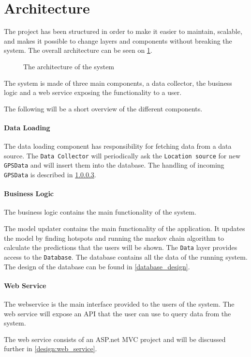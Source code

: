 \section{Architecture}

The project has been structured in order to make it easier to maintain, scalable, and makes it possible to change  layers and components without breaking the system.
The overall architecture can be seen on \cref{arch}.

\begin{figure}[h]
\center

\caption{The architecture of the system}
\label{arch}
\end{figure}

The system is made of three main components, a data collector, the business logic and a web service exposing the functionality to a user.

The following will be a short overview of the different components.

\paragraph{Data Loading}
The data loading component has responsibility for fetching data from a data source.
The \texttt{Data Collector} will periodically ask the \texttt{Location source} for new \texttt{GPSData} and will insert them into the database. 
The handling of incoming \texttt{GPSData} is described in  \cref{}.

\paragraph{Business Logic}
The business logic contains the main functionality of the system.

The model updater contains the main functionality of the application.
It updates the model by finding hotspots and running the markov chain algorithm to calculate the predictions that the users will be shown.
The \texttt{Data} layer provides access to the \texttt{Database}.
The database contains all the data of the running system.
The design of the database can be found in \cref{database_design}.

\paragraph{Web Service}
The webservice is the main interface provided to the users of the system.
The web service will expose an API that the user can use to query data from the system.

The web service consists of an ASP.net MVC project and will be discussed further in \cref{design:web_service}.






